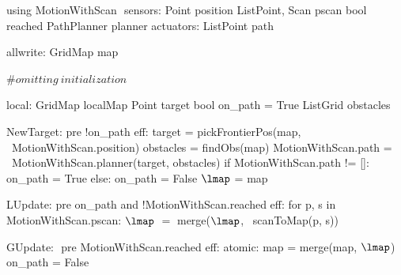 using MotionWithScan $\label{moddef}$
    sensors:
        Point position
        List\<Point, Scan\> pscan
        bool reached
        PathPlanner planner
    actuators:
        List\<Point\> path

allwrite:$\label{awvar}$
    GridMap map

#$\mathit{omitting\ initialization}$

local:
   GridMap localMap
   Point target
   bool on_path = True
   List\<Grid\> obstacles

NewTarget:$\label{newpt}$
  pre !on_path
  eff:
     target = pickFrontierPos(map, \
                         MotionWithScan.position)
     obstacles = findObs(map)
     MotionWithScan.path = \
        MotionWithScan.planner(target, obstacles)
     if MotionWithScan.path != []:
        on_path = True
     else:
        on_path = False
     $\lmap$ = map

LUpdate:$\label{lup}$
   pre on_path and !MotionWithScan.reached
   eff:
      for p, s in MotionWithScan.pscan:
         $\lmap$ $=$ merge($\lmap$, \
                             scanToMap(p, s))

GUpdate: $\label{gup}$
  pre MotionWithScan.reached
  eff: atomic:
        map = merge(map, $\lmap$)
        on_path = False
